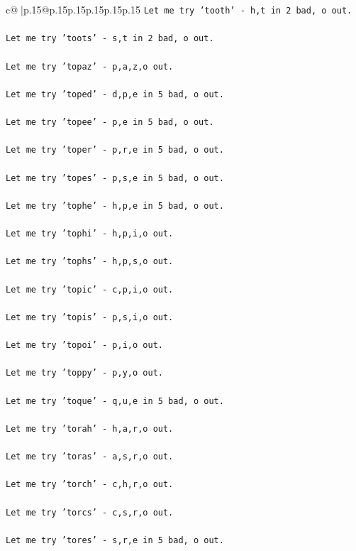 \documentclass{article}
\begin{document}
{\begin{supertabular}{c@{$\;$}|p{.15\linewidth}@{}p{.15\linewidth}p{.15\linewidth}p{.15\linewidth}p{.15\linewidth}p{.15\linewidth}}
{{{\texttt{Let me try 'tooth' {-} h,t in 2 bad, o out. } \\
\\ 
\texttt{Let me try 'toots' {-} s,t in 2 bad, o out. } \\
\\ 
\texttt{Let me try 'topaz' {-} p,a,z,o out. } \\
\\ 
\texttt{Let me try 'toped' {-} d,p,e in 5 bad, o out. } \\
\\ 
\texttt{Let me try 'topee' {-} p,e in 5 bad, o out. } \\
\\ 
\texttt{Let me try 'toper' {-} p,r,e in 5 bad, o out. } \\
\\ 
\texttt{Let me try 'topes' {-} p,s,e in 5 bad, o out. } \\
\\ 
\texttt{Let me try 'tophe' {-} h,p,e in 5 bad, o out. } \\
\\ 
\texttt{Let me try 'tophi' {-} h,p,i,o out. } \\
\\ 
\texttt{Let me try 'tophs' {-} h,p,s,o out. } \\
\\ 
\texttt{Let me try 'topic' {-} c,p,i,o out. } \\
\\ 
\texttt{Let me try 'topis' {-} p,s,i,o out. } \\
\\ 
\texttt{Let me try 'topoi' {-} p,i,o out. } \\
\\ 
\texttt{Let me try 'toppy' {-} p,y,o out. } \\
\\ 
\texttt{Let me try 'toque' {-} q,u,e in 5 bad, o out. } \\
\\ 
\texttt{Let me try 'torah' {-} h,a,r,o out. } \\
\\ 
\texttt{Let me try 'toras' {-} a,s,r,o out. } \\
\\ 
\texttt{Let me try 'torch' {-} c,h,r,o out. } \\
\\ 
\texttt{Let me try 'torcs' {-} c,s,r,o out. } \\
\\ 
\texttt{Let me try 'tores' {-} s,r,e in 5 bad, o out. } \\
}}}
\end{supertabular}}
\end{document}
